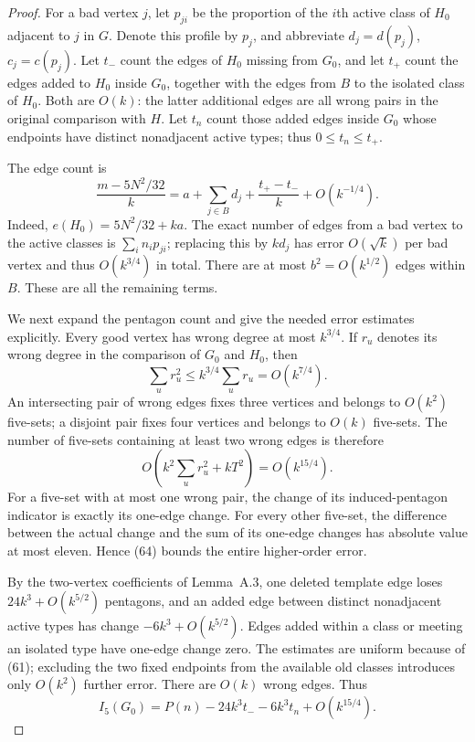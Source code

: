 \documentclass[11pt]{amsart}
\theoremstyle{definition}
\theoremstyle{remark}
\begin{document}
\begin{proof}
For a bad vertex $j$, let $p_{ji}$ be the proportion of the $i$th active
class of $H_0$ adjacent to $j$ in $G$. Denote this profile by $p_j$, and
abbreviate $d_j=d(p_j)$, $c_j=c(p_j)$. Let $t_-$ count the edges of $H_0$
missing from $G_0$, and let $t_+$ count the edges added to $H_0$ inside
$G_0$, together with the edges from $B$ to the isolated class of $H_0$.
Both are $O(k)$: the latter additional edges are all wrong pairs in the
original comparison with $H$. Let $t_n$ count those added edges inside
$G_0$ whose endpoints have distinct nonadjacent active types; thus
$0\leq t_n\leq t_+$.

The edge count is
\begin{equation}\tag{63}\label{eq:phase-edge-count}
 \frac{m-5N^2/32}{k}
 =a+\sum_{j\in B}d_j+\frac{t_+-t_-}{k}+O(k^{-1/4}).
\end{equation}
Indeed, $e(H_0)=5N^2/32+ka$. The exact number of edges from a bad
vertex to the active classes is $\sum_i n_i p_{ji}$; replacing this by
$kd_j$ has error $O(\sqrt{k})$ per bad vertex and thus $O(k^{3/4})$ in
total. There are at most $b^2=O(k^{1/2})$ edges within $B$. These are all
the remaining terms.

We next expand the pentagon count and give the needed error estimates
explicitly. Every good vertex has wrong degree at most $k^{3/4}$. If
$r_u$ denotes its wrong degree in the comparison of $G_0$ and $H_0$, then
\[
 \sum_u r_u^2\leq k^{3/4}\sum_u r_u=O(k^{7/4}).
\]
An intersecting pair of wrong edges fixes three vertices and belongs to
$O(k^2)$ five-sets; a disjoint pair fixes four vertices and belongs to
$O(k)$ five-sets. The number of five-sets containing at least two wrong
edges is therefore
\begin{equation}\tag{64}\label{eq:wrong-pair-error}
 O\left(k^2\sum_u r_u^2+kT^2\right)=O(k^{15/4}).
\end{equation}
For a five-set with at most one wrong pair, the change of its
induced-pentagon indicator is exactly its one-edge change. For every
other five-set, the difference between the actual change and the sum of
its one-edge changes has absolute value at most eleven. Hence (64)
bounds the entire higher-order error.

By the two-vertex coefficients of Lemma~A.3, one deleted template edge
loses $24k^3+O(k^{5/2})$ pentagons, and an added edge between distinct
nonadjacent active types has change $-6k^3+O(k^{5/2})$. Edges added
within a class or meeting an isolated type have one-edge change zero.
The estimates are uniform because of (61); excluding the two fixed
endpoints from the available old classes introduces only $O(k^2)$
further error. There are $O(k)$ wrong edges. Thus
\begin{equation}\tag{65}\label{eq:good-pentagons}
 I_5(G_0)=P(n)-24k^3t_--6k^3t_n+O(k^{15/4}).
\end{equation}


\end{proof}
\end{document}

